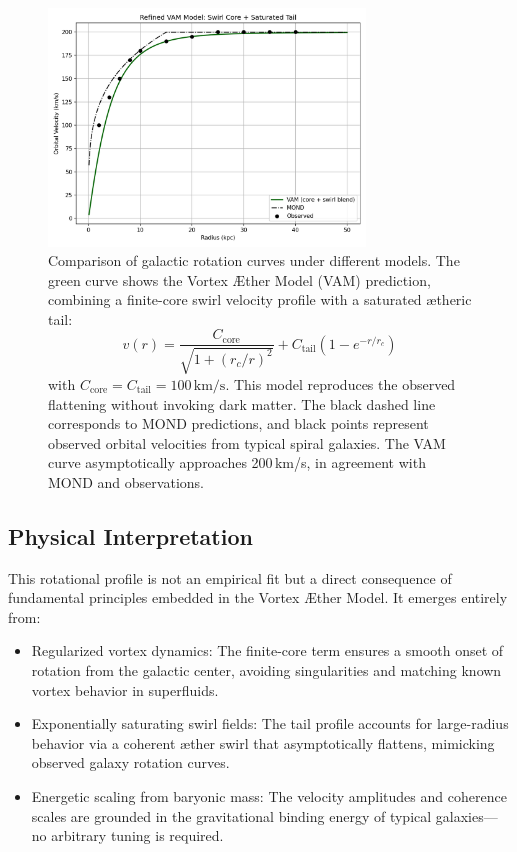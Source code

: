 \documentclass[12pt]{article}
\begin{document}
    \begin{figure}[H]
    \centering
    \includegraphics[width=0.75\textwidth]{galaxyRotation}
    \caption{
        Comparison of galactic rotation curves under different models. The green curve shows the Vortex \AE{}ther Model (VAM) prediction, combining a finite-core swirl velocity profile with a saturated ætheric tail:
        \[
            v(r) = \frac{C_{\text{core}}}{\sqrt{1 + (r_c/r)^2}} + C_{\text{tail}} (1 - e^{-r/r_c})
        \]
        with \( C_{\text{core}} = C_{\text{tail}} = 100\,\mathrm{km/s} \). This model reproduces the observed flattening without invoking dark matter. The black dashed line corresponds to MOND predictions, and black points represent observed orbital velocities from typical spiral galaxies. The VAM curve asymptotically approaches 200\,km/s, in agreement with MOND and observations.
    }
    \label{fig:vortexfields2}
\end{figure}
\subsection{Physical Interpretation}


This rotational profile is not an empirical fit but a direct consequence of fundamental principles embedded in the Vortex Æther Model. It emerges entirely from:


\begin{itemize}
\item Regularized vortex dynamics: The finite-core term ensures a smooth onset of rotation from the galactic center, avoiding singularities and matching known vortex behavior in superfluids.
\item Exponentially saturating swirl fields: The tail profile accounts for large-radius behavior via a coherent æther swirl that asymptotically flattens, mimicking observed galaxy rotation curves.
\item Energetic scaling from baryonic mass: The velocity amplitudes and coherence scales are grounded in the gravitational binding energy of typical galaxies—no arbitrary tuning is required.
\end{itemize}
\end{document}
